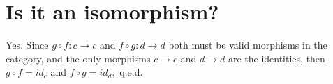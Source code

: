 \section{ Is it an isomorphism? }

Yes. Since $g \circ f : c \rightarrow c$ and $f \circ g : d \rightarrow d$ both must be valid morphisms
in the category, and the only morphisms $c \rightarrow c$ and $d \rightarrow d$ are the identities,
then $g \circ f = id_c$ and $f \circ g = id_d,$ q.e.d.
